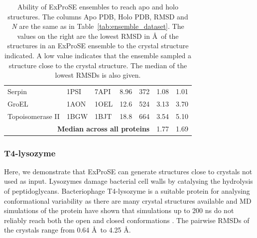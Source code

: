 \begin{table}
\begin{footnotesize}
\begin{tabular}{ r r r r r l l }
\multicolumn{1}{l}{Serpin}                    & \multicolumn{1}{l}{1PSI} & \multicolumn{1}{l}{7API} & \multicolumn{1}{l}{8.96} & \multicolumn{1}{l}{372} & 1.08  & 1.01 \\
\multicolumn{1}{l}{GroEL}                     & \multicolumn{1}{l}{1AON} & \multicolumn{1}{l}{1OEL} & \multicolumn{1}{l}{12.6} & \multicolumn{1}{l}{524} & 3.13  & 3.70 \\
\multicolumn{1}{l}{Topoisomerase II}          & \multicolumn{1}{l}{1BGW} & \multicolumn{1}{l}{1BJT} & \multicolumn{1}{l}{18.8} & \multicolumn{1}{l}{664} & 3.54  & 5.10 \\
\hline
\multicolumn{5}{r}{\textbf{Median across all proteins}} & 1.77  & 1.69 \\
\hline
\end{tabular}
\end{footnotesize}


\caption[Ability of ExProSE ensembles to sample conformational space]
{Ability of ExProSE ensembles to reach apo and holo structures.
The columns Apo PDB, Holo PDB, RMSD and \textit{N} are the same as in Table~\ref{tab:ensemble_dataset}.
The values on the right are the lowest RMSD in \AA\ of the structures in an ExProSE ensemble to the crystal structure indicated.
A low value indicates that the ensemble sampled a structure close to the crystal structure.
The median of the lowest RMSDs is also given.}

\label{tab:ensemble_dataset_ex}
\end{table}


\subsubsection{T4-lysozyme}

Here, we demonstrate that ExProSE can generate structures close to crystals not used as input.
Lysozymes damage bacterial cell walls by catalysing the hydrolysis of peptidoglycans.
Bacteriophage T4-lysozyme is a suitable protein for analysing conformational variability as there are many crystal structures available and MD simulations of the protein have shown that simulations up to 200 ns do not reliably reach both the open and closed conformations \cite{Seeliger2007}.
The pairwise RMSDs of the crystals range from 0.64 \AA\ to 4.25 \AA.

